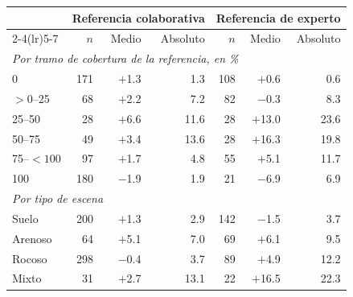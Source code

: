 \begin{tabular}{lrrrrrr}
\toprule
 & \multicolumn{3}{c}{\textbf{Referencia colaborativa}} & \multicolumn{3}{c}{\textbf{Referencia de experto}} \\
\cmidrule(lr){2-4}\cmidrule(lr){5-7}
 & $n$ & Medio & Absoluto & $n$ & Medio & Absoluto \\
\midrule
\multicolumn{7}{l}{\textit{Por tramo de cobertura de la referencia, en \%}} \\
0 & 171 & \ensuremath{+}\num{1.3} & \num{1.3} & 108 & \ensuremath{+}\num{0.6} & \num{0.6} \\
$>0$--25 & 68 & \ensuremath{+}\num{2.2} & \num{7.2} & 82 & \num{-0.3} & \num{8.3} \\
25--50 & 28 & \ensuremath{+}\num{6.6} & \num{11.6} & 28 & \ensuremath{+}\num{13.0} & \num{23.6} \\
50--75 & 49 & \ensuremath{+}\num{3.4} & \num{13.6} & 28 & \ensuremath{+}\num{16.3} & \num{19.8} \\
75--$<100$ & 97 & \ensuremath{+}\num{1.7} & \num{4.8} & 55 & \ensuremath{+}\num{5.1} & \num{11.7} \\
100 & 180 & \num{-1.9} & \num{1.9} & 21 & \num{-6.9} & \num{6.9} \\
\midrule
\multicolumn{7}{l}{\textit{Por tipo de escena}} \\
Suelo & 200 & \ensuremath{+}\num{1.3} & \num{2.9} & 142 & \num{-1.5} & \num{3.7} \\
Arenoso & 64 & \ensuremath{+}\num{5.1} & \num{7.0} & 69 & \ensuremath{+}\num{6.1} & \num{9.5} \\
Rocoso & 298 & \num{-0.4} & \num{3.7} & 89 & \ensuremath{+}\num{4.9} & \num{12.2} \\
Mixto & 31 & \ensuremath{+}\num{2.7} & \num{13.1} & 22 & \ensuremath{+}\num{16.5} & \num{22.3} \\
\bottomrule
\end{tabular}
